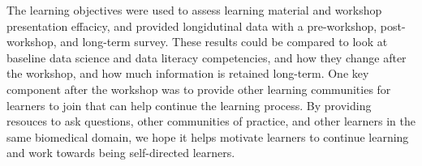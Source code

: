 \documentclass[030-workshop.tex]{subfiles}
\begin{document}
    The learning objectives were used to assess learning material and workshop presentation effacicy,
    and provided longidutinal data with a pre-workshop, post-workshop, and long-term survey.
    These results could be compared to look at baseline data science and data literacy competencies,
    and how they change after the workshop,
    and how much information is retained long-term.
    One key component after the workshop was to provide other learning communities for learners to join
    that can help continue the learning process.
    By providing resouces to ask questions, other communities of practice,
    and other learners in the same biomedical domain,
    we hope it helps motivate learners to continue learning and work towards being self-directed learners.
\end{document}
